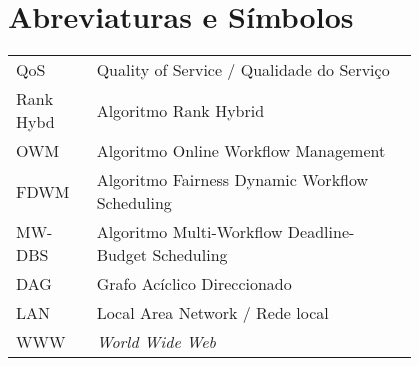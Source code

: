 \chapter*{Abreviaturas e Símbolos}

\begin{flushleft}
\begin{tabular}{l p{0.8\linewidth}}
QoS      & Quality of Service / Qualidade do Serviço\\
Rank Hybd & Algoritmo Rank Hybrid\\
OWM & Algoritmo Online Workflow Management\\
FDWM & Algoritmo Fairness Dynamic Workflow Scheduling\\
MW-DBS & Algoritmo Multi-Workflow Deadline-Budget Scheduling\\
DAG & Grafo Acíclico Direccionado\\
LAN & Local Area Network / Rede local\\
WWW      & \emph{World Wide Web}
\end{tabular}
\end{flushleft}

